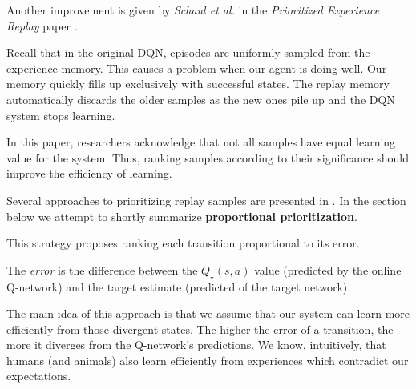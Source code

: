 Another improvement is given by \emph{Schaul et al.} in the \emph{Prioritized Experience Replay} paper \cite{per-paper}.

Recall that in the original DQN, episodes are uniformly sampled from the experience memory.
This causes a problem when our agent is doing well.
Our memory quickly fills up exclusively with successful states.
The replay memory automatically discards the older samples as the new ones pile up and the DQN system stops learning.

In this paper, researchers acknowledge that not all samples have equal learning value for the system.
Thus, ranking samples according to their significance should improve the efficiency of learning.

Several approaches to prioritizing replay samples are presented in \cite{per-paper}. In the section below we attempt to shortly summarize \textbf{proportional prioritization}.

This strategy proposes ranking each transition proportional to its error.

The \emph{error} is the difference between the \(Q_{\star}(s, a)\)  value (predicted by the online Q-network) and the target estimate (predicted of the target network).

The main idea of this approach is that we assume that our system can learn more efficiently from those divergent states.
The higher the error of a transition, the more it diverges from the Q-network's predictions.
We know, intuitively, that humans (and animals) also learn efficiently from experiences which contradict our expectations.